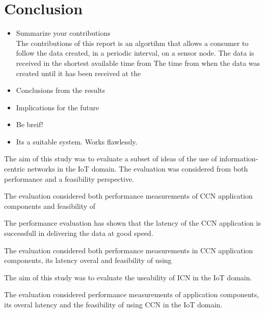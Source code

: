 \section{Conclusion}

\begin{itemize}
\item Summarize your contributions\\
The contributions of this report is an algortihm that allows a consumer to follow the data created, in a periodic interval, on a sensor node. 
The data is received in the shortest available time from 
The time from when the data was created until it has been received at the 

\item Conclusions from the results
\item Implications for the future 
\item Be breif!

\item Its a suitable system. Works flawlessly.
\end{itemize}



The aim of this study was to evaluate a subset of ideas of the use of information-centric networks in the IoT domain. The evaluation was considered from both performance and a feasibility perspective.

The evaluation considered both performance measurements of CCN application components and feasibility of 

The performance evaluation has shown that the latency of the CCN application is successfull in delivering the data at good speed.


The evaluation considered both performance measurements in CCN application components, its latency overal and feasibility of using 

The aim of this study was to evaluate the useability of ICN in the IoT domain.

The evaluation considered performance measurements of application components, its overal latency and the feasibility of using CCN in the IoT domain.




